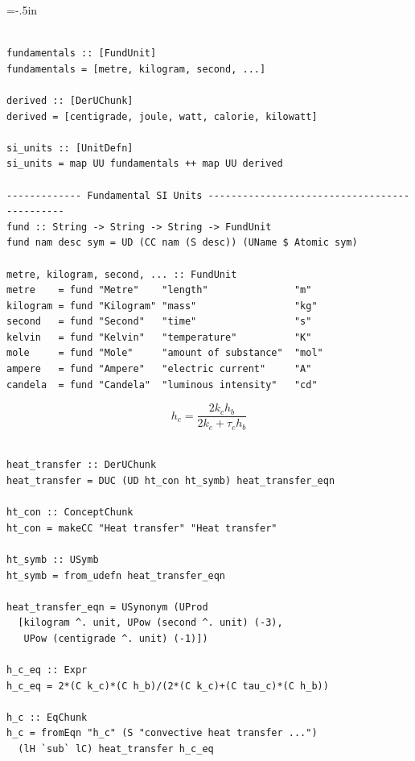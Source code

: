 \documentclass{beamer}
\begin{document}
\hoffset=0in %

\hoffset=-.5in %

\begin{frame}


\begin{lstlisting}

fundamentals :: [FundUnit]
fundamentals = [metre, kilogram, second, ...]

derived :: [DerUChunk]
derived = [centigrade, joule, watt, calorie, kilowatt]

si_units :: [UnitDefn]
si_units = map UU fundamentals ++ map UU derived

------------- Fundamental SI Units ---------------------------------------------
fund :: String -> String -> String -> FundUnit
fund nam desc sym = UD (CC nam (S desc)) (UName $ Atomic sym)

metre, kilogram, second, ... :: FundUnit
metre    = fund "Metre"    "length"               "m"
kilogram = fund "Kilogram" "mass"                 "kg"
second   = fund "Second"   "time"                 "s"
kelvin   = fund "Kelvin"   "temperature"          "K"
mole     = fund "Mole"     "amount of substance"  "mol"
ampere   = fund "Ampere"   "electric current"     "A"
candela  = fund "Candela"  "luminous intensity"   "cd"

\end{lstlisting}
\end{frame}

\hoffset=0in %


\hoffset=-0.5in %
\begin{frame}


$$h_{c} = \frac{2k_{c} h_{b}}{2k_{c}+\tau_{c}h_{b}}$$

\begin{lstlisting}

heat_transfer :: DerUChunk
heat_transfer = DUC (UD ht_con ht_symb) heat_transfer_eqn

ht_con :: ConceptChunk
ht_con = makeCC "Heat transfer" "Heat transfer"

ht_symb :: USymb
ht_symb = from_udefn heat_transfer_eqn

heat_transfer_eqn = USynonym (UProd 
  [kilogram ^. unit, UPow (second ^. unit) (-3),
   UPow (centigrade ^. unit) (-1)])

h_c_eq :: Expr
h_c_eq = 2*(C k_c)*(C h_b)/(2*(C k_c)+(C tau_c)*(C h_b))

h_c :: EqChunk
h_c = fromEqn "h_c" (S "convective heat transfer ...") 
  (lH `sub` lC) heat_transfer h_c_eq

\end{lstlisting}

\end{frame}
\end{document}
